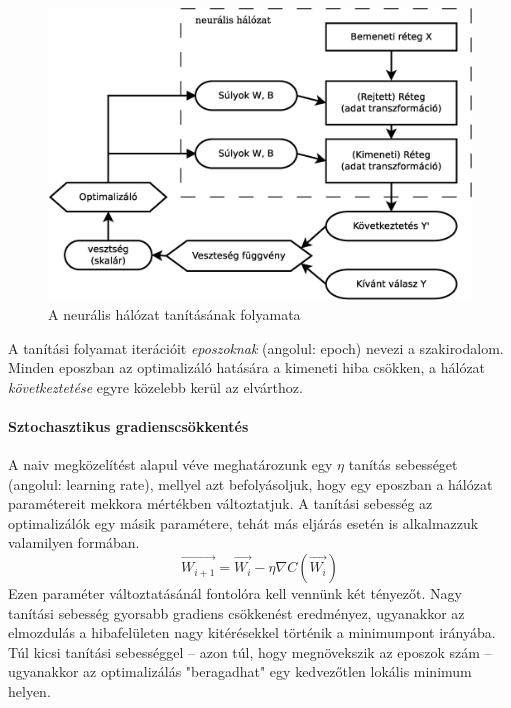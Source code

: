 \begin{figure}[h]
	\centering
	\includegraphics[width=0.7\linewidth]{fig/DNN_dia}
	\caption{A neurális hálózat tanításának folyamata}
	\label{fig:dnn}
\end{figure}

A tanítási folyamat iterációit \emph{eposzoknak} (angolul: epoch) nevezi a szakirodalom. Minden eposzban az optimalizáló hatására a kimeneti hiba csökken, a hálózat \emph{következtetése} egyre közelebb kerül az elvárthoz. 

\paragraph[SGD]{Sztochasztikus gradienscsökkentés}
A naiv megközelítést alapul véve meghatározunk egy $\eta$ tanítás sebességet (angolul: learning rate), mellyel azt befolyásoljuk, hogy egy eposzban a hálózat paramétereit mekkora mértékben változtatjuk. A tanítási sebesség az optimalizálók egy másik paramétere, tehát más eljárás esetén is alkalmazzuk valamilyen formában.
\begin{displaymath}
\vec{W_{i+1}} = \vec{W_i} - \eta\nabla C(\vec{W_i})
\end{displaymath}
Ezen paraméter változtatásánál fontolóra kell vennünk két tényezőt. Nagy tanítási sebesség gyorsabb gradiens csökkenést eredményez, ugyanakkor az elmozdulás a hibafelületen nagy kitérésekkel történik a minimumpont irányába. Túl kicsi tanítási sebességgel -- azon túl, hogy megnövekszik az eposzok szám --  ugyanakkor az optimalizálás "beragadhat" egy kedvezőtlen lokális minimum helyen.

